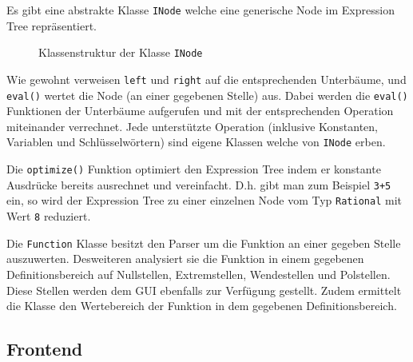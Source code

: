 \documentclass[12pt]{article}
\begin{document}
	Es gibt eine abstrakte Klasse \texttt{INode} welche eine generische Node im Expression Tree repräsentiert.
	\begin{figure}[h!]
		\begin{center}
		\end{center}
		\caption{Klassenstruktur der Klasse \texttt{INode}}
	\end{figure}
	Wie gewohnt verweisen \texttt{left} und \texttt{right} auf die entsprechenden Unterbäume, und \texttt{eval()} wertet die Node (an einer gegebenen Stelle) aus.
	Dabei werden die \texttt{eval()} Funktionen der Unterbäume aufgerufen und mit der entsprechenden Operation miteinander verrechnet. 
	Jede unterstützte Operation (inklusive Konstanten, Variablen und Schlüsselwörtern) sind eigene Klassen welche von \texttt{INode} erben.

	Die \texttt{optimize()} Funktion optimiert den Expression Tree indem er konstante Ausdrücke bereits ausrechnet und vereinfacht. D.h. gibt man zum Beispiel \texttt{3+5} ein, so wird
	der Expression Tree zu einer einzelnen Node vom Typ \texttt{Rational} mit Wert \texttt{8} reduziert.

	Die \texttt{Function} Klasse besitzt den Parser um die Funktion an einer gegeben Stelle auszuwerten. Desweiteren analysiert sie die Funktion in einem
	gegebenen Definitionsbereich auf Nullstellen, Extremstellen, Wendestellen und Polstellen. Diese Stellen werden dem GUI ebenfalls
	zur Verfügung gestellt. Zudem ermittelt die Klasse den Wertebereich der Funktion in dem gegebenen Definitionsbereich.

	\subsection*{Frontend}
\end{document}
